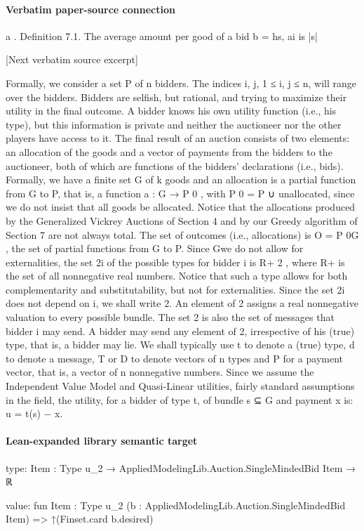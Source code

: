 \documentclass[10pt]{article}
\begin{document}
\paragraph{Verbatim paper-source connection}
\begin{ReviewVerbatim}
a
.
Definition 7.1. The average amount per good of a bid b = hs, ai is |s|

[Next verbatim source excerpt]

Formally, we consider a set P of n bidders. The indices i, j, 1 ≤ i, j ≤ n, will
range over the bidders. Bidders are selfish, but rational, and trying to maximize their
utility in the final outcome. A bidder knows his own utility function (i.e., his type),
but this information is private and neither the auctioneer nor the other players have
access to it. The final result of an auction consists of two elements: an allocation
of the goods and a vector of payments from the bidders to the auctioneer, both of
which are functions of the bidders’ declarations (i.e., bids). Formally, we have a
finite set G of k goods and an allocation is a partial function from G to P, that is, a
function a : G → P 0 , with P 0 = P ∪ {unallocated}, since we do not insist that all
goods be allocated. Notice that the allocations produced by the Generalized Vickrey
Auctions of Section 4 and by our Greedy algorithm of Section 7 are not always
total. The set of outcomes (i.e., allocations) is O = P 0G , the set of partial functions
from G to P. Since Gwe do not allow for externalities, the set 2i of the possible types
for bidder i is R+ 2 , where R+ is the set of all nonnegative real numbers. Notice
that such a type allows for both complementarity and substitutability, but not for
externalities. Since the set 2i does not depend on i, we shall write 2. An element
of 2 assigns a real nonnegative valuation to every possible bundle. The set 2 is
also the set of messages that bidder i may send. A bidder may send any element of
2, irrespective of his (true) type, that is, a bidder may lie. We shall typically use t
to denote a (true) type, d to denote a message, T or D to denote vectors of n types
and P for a payment vector, that is, a vector of n nonnegative numbers.
Since we assume the Independent Value Model and Quasi-Linear utilities, fairly
standard assumptions in the field, the utility, for a bidder of type t, of bundle s ⊆ G
and payment x is:
u = t(s) − x.
\end{ReviewVerbatim}



\paragraph{Lean-expanded library semantic target}
\begin{ReviewVerbatim}
type:
{Item : Type u_2} → AppliedModelingLib.Auction.SingleMindedBid Item → ℝ

value:
fun {Item : Type u_2} (b : AppliedModelingLib.Auction.SingleMindedBid Item) => ↑(Finset.card b.desired)
\end{ReviewVerbatim}
\end{document}
